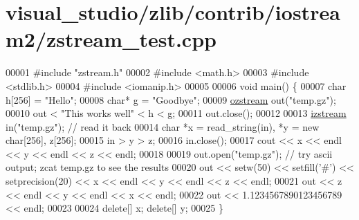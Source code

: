 \hypertarget{visual__studio_2zlib_2contrib_2iostream2_2zstream__test_8cpp_source}{}\section{visual\+\_\+studio/zlib/contrib/iostream2/zstream\+\_\+test.cpp}
\label{visual__studio_2zlib_2contrib_2iostream2_2zstream__test_8cpp_source}

\begin{DoxyCode}
00001 \textcolor{preprocessor}{#include "zstream.h"}
00002 \textcolor{preprocessor}{#include <math.h>}
00003 \textcolor{preprocessor}{#include <stdlib.h>}
00004 \textcolor{preprocessor}{#include <iomanip.h>}
00005 
00006 \textcolor{keywordtype}{void} main() \{
00007     \textcolor{keywordtype}{char} h[256] = \textcolor{stringliteral}{"Hello"};
00008     \textcolor{keywordtype}{char}* g = \textcolor{stringliteral}{"Goodbye"};
00009     \hyperlink{classozstream}{ozstream} out(\textcolor{stringliteral}{"temp.gz"});
00010     out < \textcolor{stringliteral}{"This works well"} < h < g;
00011     out.close();
00012 
00013     \hyperlink{classizstream}{izstream} in(\textcolor{stringliteral}{"temp.gz"}); \textcolor{comment}{// read it back}
00014     \textcolor{keywordtype}{char} *x = read\_string(in), *y = \textcolor{keyword}{new} \textcolor{keywordtype}{char}[256], z[256];
00015     in > y > z;
00016     in.close();
00017     cout << x << endl << y << endl << z << endl;
00018 
00019     out.open(\textcolor{stringliteral}{"temp.gz"}); \textcolor{comment}{// try ascii output; zcat temp.gz to see the results}
00020     out << setw(50) << setfill(\textcolor{charliteral}{'#'}) << setprecision(20) << x << endl << y << endl << z << endl;
00021     out << z << endl << y << endl << x << endl;
00022     out << 1.1234567890123456789 << endl;
00023 
00024     \textcolor{keyword}{delete}[] x; \textcolor{keyword}{delete}[] y;
00025 \}
\end{DoxyCode}
